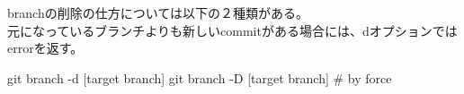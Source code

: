 \documentclass[10pt,a4j,openany,dvipdfmx]{jsarticle}
\begin{document}
branchの削除の仕方については以下の２種類がある。\\
元になっているブランチよりも新しいcommitがある場合には、dオプションではerrorを返す。
\begin{commandshell}
git branch -d [target branch]
git branch -D [target branch]   # by force
\end{commandshell}





\end{document}
